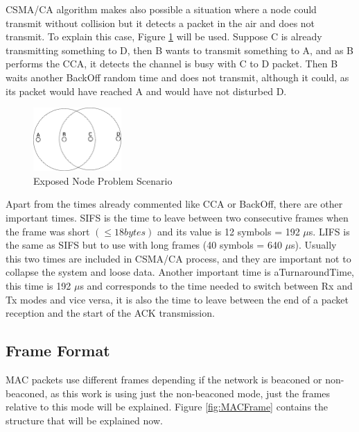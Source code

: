 \ac{CSMA/CA} algorithm makes also possible a situation where a node could transmit without collision but it detects a packet in the air and does
not transmit. To explain this case, Figure \ref{fig:ExposedNodeProblem} will be used. Suppose C is already transmitting something to D, 
then B wants to transmit something to A, and as B performs the \ac{CCA}, it detects the channel is busy with C to D packet. Then B waits another
BackOff random time and does not transmit, although it could, as its packet would have reached A and would have not disturbed D.

\begin{figure}[!ht]
 \begin{center}
  \includegraphics[width=0.3\textwidth]{ExposedNodeProblem.eps}
 \end{center}
 \caption{Exposed Node Problem Scenario}
 \label{fig:ExposedNodeProblem}
\end{figure}

Apart from the times already commented like \ac{CCA} or BackOff, there are other important times. \ac{SIFS} is the time to leave between two 
consecutive frames when the frame was short $(\le 18 bytes)$ and its value is 12 symbols = 192 $\mu$s. \ac{LIFS} is the same as \ac{SIFS} but
to use with long frames (40 symbols = 640 $\mu$s). Usually this two times are included in \ac{CSMA/CA} process, and they are important not to
collapse the system and loose data. Another important time is 
aTurnaroundTime, this time is 192 $\mu$s and corresponds to the time needed to switch between \ac{Rx} and \ac{Tx} modes and vice versa, it is
also the time to leave between the end of a packet reception and the start of the \ac{ACK} transmission.

\subsection{Frame Format}

\ac{MAC} packets use different frames depending if the network is beaconed or non-beaconed, as this work is using just the non-beaconed mode,
just the frames relative to this mode will be explained. Figure \ref{fig:MACFrame} contains the structure that will be explained now.

